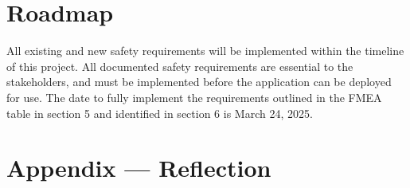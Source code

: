 \documentclass{article}
\begin{document}
\section{Roadmap}

All existing and new safety requirements will be implemented within
the timeline of this project. All documented safety requirements are
essential to the stakeholders, and must be implemented before the
application can be deployed for use. The date to fully implement the requirements outlined in the FMEA table in section 5
and identified in section 6 is March 24, 2025.

\newpage{}

\section*{Appendix --- Reflection}


\end{document}
